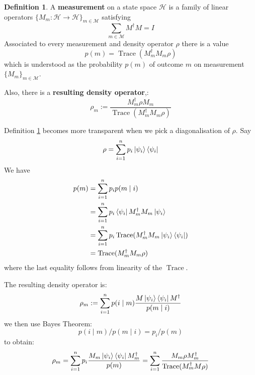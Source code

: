 \documentclass[12pt]{article}
\theoremstyle{plain}
\theoremstyle{definition}
\newtheorem{defn}[thm]{Definition} %
\newcommand{\call}[1]{\mathcal{#1}}
\newcommand{\lto}{\longrightarrow}
\begin{document}
	\begin{defn}\label{def:density_measurement}
		A \textbf{measurement} on a state space $\call{H}$ is a family of linear operators $\lbrace M_m: \call{H} \lto \call{H}\rbrace_{m \in \call{M}}$ satisfying
		\begin{equation}
			\sum_{m \in \call{M}}M^\dagger M = I
		\end{equation}
		Associated to every measurement and density operator $\rho$ there is a value
		\begin{equation}
			p(m) = \operatorname{Trace}(M^\dagger_mM_m \rho)
		\end{equation}
		which is understood as the probability $p(m)$ of outcome $m$ on measurement $\lbrace M_m\rbrace_{m \in \call{M}}$.
		
		Also, there is a \textbf{resulting density operator},:
		\begin{equation}
			\rho_m := \frac{M_m^\dagger \rho M_m}{\operatorname{Trace}(M^\dagger_mM_m \rho)}
		\end{equation}
	\end{defn}
	Definition \ref{def:density_measurement} becomes more transparent when we pick a diagonalisation of $\rho$. Say
	\begin{equation}
		\rho = \sum_{i = 1}^n p_i \ket{\psi_i}\bra{\psi_i}
		\end{equation}
	We have
	\begin{align*}
		p(m) &= \sum_{i = 1}^n p_i p(m \mid i)\\
		&=\sum_{i = 1}^n p_i \bra{\psi_i}M^\dagger_m M_m \ket{\psi_i}\\
		&= \sum_{i = 1}^n p_i \operatorname{Trace}(M^\dagger_m M_m \ket{\psi_i}\bra{\psi_i})\\
		&= \operatorname{Trace}(M^\dagger_m M_m \rho)
	\end{align*}
	where the last equality follows from linearity of the $\operatorname{Trace}$.
	
	The resulting density operator is:
	\begin{equation}
		\rho_m := \sum_{i = 1}^n p(i\mid m)\frac{M\ket{\psi_i}\bra{\psi_i}M^\dagger}{p(m \mid i)}
	\end{equation}
	we then use Bayes Theorem:
	\begin{equation}
		p(i \mid m)/p(m \mid i) = p_i/p(m)
	\end{equation}
	to obtain:
	\begin{equation}
		\rho_m = \sum_{i = 1}^n p_i\frac{M_m\ket{\psi_i}\bra{\psi_i}M_m^\dagger}{p(m)} = \sum_{i = 1}^n \frac{M_m\rho M_m^\dagger}{\operatorname{Trace}(M^\dagger_m M \rho)}
	\end{equation}
	
\end{document}

